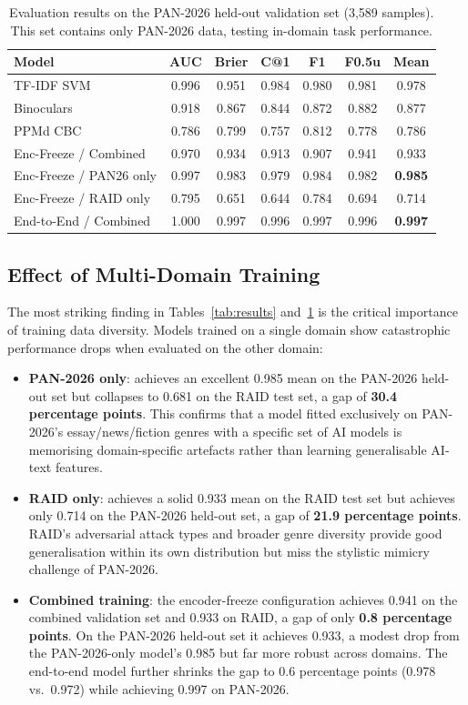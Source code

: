 \documentclass[]{ceurart}
\begin{document}
\begin{table}[t]
  \caption{Evaluation results on the PAN-2026 held-out validation set (3,589 samples). This set contains only PAN-2026 data, testing in-domain task performance.}
  \label{tab:pan26results}
  \begin{tabular}{lcccccc}
    \toprule
    Model & AUC & Brier & C@1 & F1 & F0.5u & Mean \\
    \midrule
    TF-IDF SVM & 0.996 & 0.951 & 0.984 & 0.980 & 0.981 & 0.978 \\
    Binoculars & 0.918 & 0.867 & 0.844 & 0.872 & 0.882 & 0.877 \\
    PPMd CBC   & 0.786 & 0.799 & 0.757 & 0.812 & 0.778 & 0.786 \\
    \midrule
    Enc-Freeze / Combined & 0.970 & 0.934 & 0.913 & 0.907 & 0.941 & 0.933 \\
    Enc-Freeze / PAN26 only & 0.997 & 0.983 & 0.979 & 0.984 & 0.982 & \textbf{0.985} \\
    Enc-Freeze / RAID only  & 0.795 & 0.651 & 0.644 & 0.784 & 0.694 & 0.714 \\
    End-to-End / Combined   & 1.000 & 0.997 & 0.996 & 0.997 & 0.996 & \textbf{0.997} \\
    \bottomrule
  \end{tabular}
\end{table}

\subsection{Effect of Multi-Domain Training}

The most striking finding in Tables~\ref{tab:results} and~\ref{tab:pan26results} is the critical importance of training data diversity. Models trained on a single domain show catastrophic performance drops when evaluated on the other domain:

\begin{itemize}
  \item \textbf{PAN-2026 only}: achieves an excellent 0.985 mean on the PAN-2026 held-out set but collapses to 0.681 on the RAID test set, a gap of \textbf{30.4 percentage points}. This confirms that a model fitted exclusively on PAN-2026's essay/news/fiction genres with a specific set of AI models is memorising domain-specific artefacts rather than learning generalisable AI-text features.
  \item \textbf{RAID only}: achieves a solid 0.933 mean on the RAID test set but achieves only 0.714 on the PAN-2026 held-out set, a gap of \textbf{21.9 percentage points}. RAID's adversarial attack types and broader genre diversity provide good generalisation within its own distribution but miss the stylistic mimicry challenge of PAN-2026.
  \item \textbf{Combined training}: the encoder-freeze configuration achieves 0.941 on the combined validation set and 0.933 on RAID, a gap of only \textbf{0.8 percentage points}. On the PAN-2026 held-out set it achieves 0.933, a modest drop from the PAN-2026-only model's 0.985 but far more robust across domains. The end-to-end model further shrinks the gap to 0.6 percentage points (0.978 vs.\ 0.972) while achieving 0.997 on PAN-2026.
\end{itemize}
\end{document}
